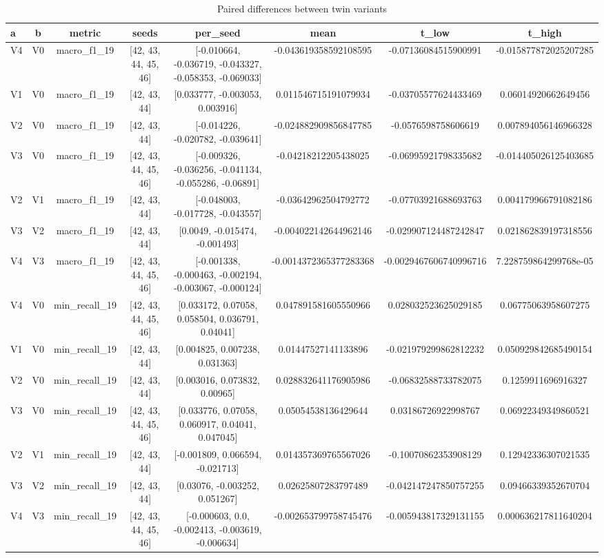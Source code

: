 \begin{table}[htbp]
\centering
\caption{Paired differences between twin variants}
\label{tab:twin_differences}
\begin{tabular}{lccccccc}
\toprule
a & b & metric & seeds & per\_seed & mean & t\_low & t\_high \\
\midrule
V4 & V0 & macro\_f1\_19 & [42, 43, 44, 45, 46] & [-0.010664, -0.036719, -0.043327, -0.058353, -0.069033] & -0.043619358592108595 & -0.07136084515900991 & -0.015877872025207285 \\
V1 & V0 & macro\_f1\_19 & [42, 43, 44] & [0.033777, -0.003053, 0.003916] & 0.011546715191079934 & -0.03705577624433469 & 0.06014920662649456 \\
V2 & V0 & macro\_f1\_19 & [42, 43, 44] & [-0.014226, -0.020782, -0.039641] & -0.024882909856847785 & -0.0576598758606619 & 0.007894056146966328 \\
V3 & V0 & macro\_f1\_19 & [42, 43, 44, 45, 46] & [-0.009326, -0.036256, -0.041134, -0.055286, -0.06891] & -0.04218212205438025 & -0.06995921798335682 & -0.014405026125403685 \\
V2 & V1 & macro\_f1\_19 & [42, 43, 44] & [-0.048003, -0.017728, -0.043557] & -0.03642962504792772 & -0.07703921688693763 & 0.004179966791082186 \\
V3 & V2 & macro\_f1\_19 & [42, 43, 44] & [0.0049, -0.015474, -0.001493] & -0.004022142644962146 & -0.029907124487242847 & 0.021862839197318556 \\
V4 & V3 & macro\_f1\_19 & [42, 43, 44, 45, 46] & [-0.001338, -0.000463, -0.002194, -0.003067, -0.000124] & -0.0014372365377283368 & -0.0029467606740996716 & 7.228759864299768e-05 \\
V4 & V0 & min\_recall\_19 & [42, 43, 44, 45, 46] & [0.033172, 0.07058, 0.058504, 0.036791, 0.04041] & 0.047891581605550966 & 0.028032523625029185 & 0.06775063958607275 \\
V1 & V0 & min\_recall\_19 & [42, 43, 44] & [0.004825, 0.007238, 0.031363] & 0.01447527141133896 & -0.021979299862812232 & 0.050929842685490154 \\
V2 & V0 & min\_recall\_19 & [42, 43, 44] & [0.003016, 0.073832, 0.00965] & 0.028832641176905986 & -0.06832588733782075 & 0.1259911696916327 \\
V3 & V0 & min\_recall\_19 & [42, 43, 44, 45, 46] & [0.033776, 0.07058, 0.060917, 0.04041, 0.047045] & 0.05054538136429644 & 0.03186726922998767 & 0.06922349349860521 \\
V2 & V1 & min\_recall\_19 & [42, 43, 44] & [-0.001809, 0.066594, -0.021713] & 0.014357369765567026 & -0.10070862353908129 & 0.12942336307021535 \\
V3 & V2 & min\_recall\_19 & [42, 43, 44] & [0.03076, -0.003252, 0.051267] & 0.02625807283797489 & -0.042147247850757255 & 0.09466339352670704 \\
V4 & V3 & min\_recall\_19 & [42, 43, 44, 45, 46] & [-0.000603, 0.0, -0.002413, -0.003619, -0.006634] & -0.002653799758745476 & -0.005943817329131155 & 0.000636217811640204 \\
\bottomrule
\end{tabular}
\end{table}